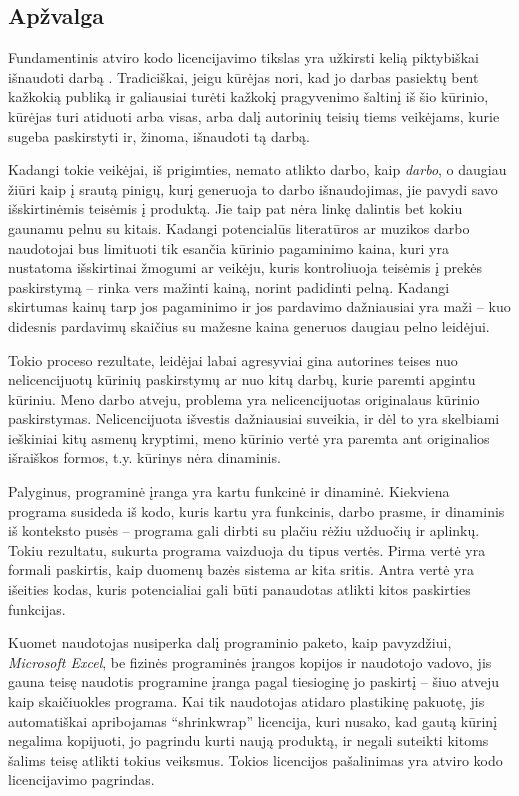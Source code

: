 \subsection{Apžvalga}

Fundamentinis atviro kodo licencijavimo tikslas yra užkirsti kelią piktybiškai išnaudoti darbą \cite{Laurent:2004:UOS:1096111}.
Tradiciškai, jeigu kūrėjas nori, kad jo darbas pasiektų bent kažkokią publiką ir galiausiai turėti kažkokį pragyvenimo šaltinį iš šio kūrinio, kūrėjas turi atiduoti arba visas, arba dalį autorinių teisių tiems veikėjams, kurie sugeba paskirstyti ir, žinoma, išnaudoti tą darbą.

Kadangi tokie veikėjai, iš prigimties, nemato atlikto darbo, kaip \textit{darbo}, o daugiau žiūri kaip į srautą pinigų, kurį generuoja to darbo išnaudojimas, jie pavydi savo išskirtinėmis teisėmis į produktą.
Jie taip pat nėra linkę dalintis bet kokiu gaunamu pelnu su kitais.
Kadangi potencialūs literatūros ar muzikos darbo naudotojai bus limituoti tik esančia kūrinio pagaminimo kaina, kuri yra nustatoma išskirtinai žmogumi ar veikėju, kuris kontroliuoja teisėmis į prekės paskirstymą -- rinka vers mažinti kainą, norint padidinti pelną.
Kadangi skirtumas kainų tarp jos pagaminimo ir jos pardavimo dažniausiai yra maži -- kuo didesnis pardavimų skaičius su mažesne kaina generuos daugiau pelno leidėjui.

Tokio proceso rezultate, leidėjai labai agresyviai gina autorines teises nuo nelicencijuotų kūrinių paskirstymų ar nuo kitų darbų, kurie paremti apgintu kūriniu.
Meno darbo atveju, problema yra nelicencijuotas originalaus kūrinio paskirstymas. 
Nelicencijuota išvestis dažniausiai suveikia, ir dėl to yra skelbiami ieškiniai kitų asmenų kryptimi, meno kūrinio vertė yra paremta ant originalios išraiškos formos, t.y. kūrinys nėra dinaminis.

Palyginus, programinė įranga yra kartu funkcinė ir dinaminė.
Kiekviena programa susideda iš kodo, kuris kartu yra funkcinis, darbo prasme, ir dinaminis iš konteksto pusės -- programa gali dirbti su plačiu rėžiu užduočių ir aplinkų.
Tokiu rezultatu, sukurta programa vaizduoja du tipus vertės.
Pirma vertė yra formali paskirtis, kaip duomenų bazės sistema ar kita sritis.
Antra vertė yra išeities kodas, kuris potencialiai gali būti panaudotas atlikti kitos paskirties funkcijas.

Kuomet naudotojas nusiperka dalį programinio paketo, kaip pavyzdžiui, \textit{Microsoft Excel}, be fizinės programinės įrangos kopijos ir naudotojo vadovo, jis gauna teisę naudotis programine įranga pagal tiesioginę jo paskirtį -- šiuo atveju kaip skaičiuokles programa. 
Kai tik naudotojas atidaro plastikinę pakuotę, jis automatiškai apribojamas ``shrinkwrap'' licencija, kuri nusako, kad gautą kūrinį negalima kopijuoti, jo pagrindu kurti naują produktą, ir negali suteikti kitoms šalims teisę atlikti tokius veiksmus.
Tokios licencijos pašalinimas yra atviro kodo licencijavimo pagrindas.

